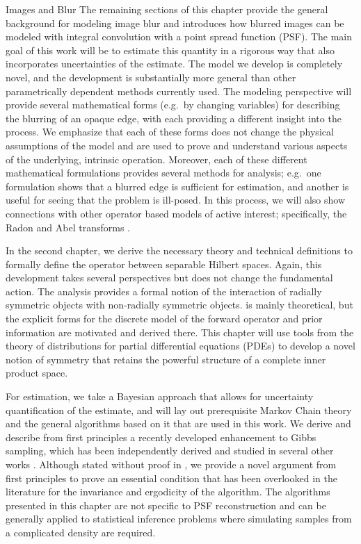 \begin{chapter}{Images and Blur}
The remaining sections of this chapter provide the general background for modeling image blur and introduces how blurred images can be modeled with integral convolution with a point spread function (PSF).
The main goal of this work will be to estimate this quantity in a rigorous way that also incorporates uncertainties of the estimate.
The model we develop is completely novel, and the development is substantially more general than other parametrically dependent methods currently used.
The modeling perspective will provide several mathematical forms (e.g.~by changing variables) for describing the blurring of an opaque edge, with each providing a different insight into the process.
 We emphasize that each of these forms does not change the physical assumptions of the model and are used to prove and understand various aspects of the underlying, intrinsic operation. 
Moreover, each of these different mathematical formulations provides several methods for analysis; e.g.~one formulation shows that a blurred edge is sufficient for estimation, and another is useful for seeing that the problem is ill-posed.  
In this process, we will also show connections with other operator based models of active interest; specifically, the Radon and Abel transforms \cite{epstein2008}.

  In the second chapter, we derive the necessary theory and technical definitions to formally define the operator between separable Hilbert spaces.
  Again, this development takes several perspectives but does not change the fundamental action.
  The analysis provides a formal notion of the interaction of radially symmetric objects with non-radially symmetric objects.
   is mainly theoretical, but the explicit forms for the discrete model of the forward operator and prior information are motivated and derived there.
  This chapter will use tools from the theory of distributions for partial differential equations (PDEs) to develop a novel notion of symmetry that retains the powerful structure of a complete inner product space. 

  For estimation, we take a Bayesian approach that allows for uncertainty quantification of the estimate, and  will lay out prerequisite Markov Chain theory and the general algorithms based on it that are used in this work.
  We derive and describe from first principles a recently developed enhancement to Gibbs sampling, which has been independently derived and studied in several other works \citep{van2008partially,agapiou2014analysis}.
  Although stated without proof in \citep{van2008partially}, we provide a novel argument from first principles to prove an essential condition that has been overlooked in the literature for the invariance and ergodicity of the algorithm.
  The algorithms presented in this chapter are not specific to PSF reconstruction and can be generally applied to statistical inference problems where simulating samples from a complicated density are required.


\end{chapter}
